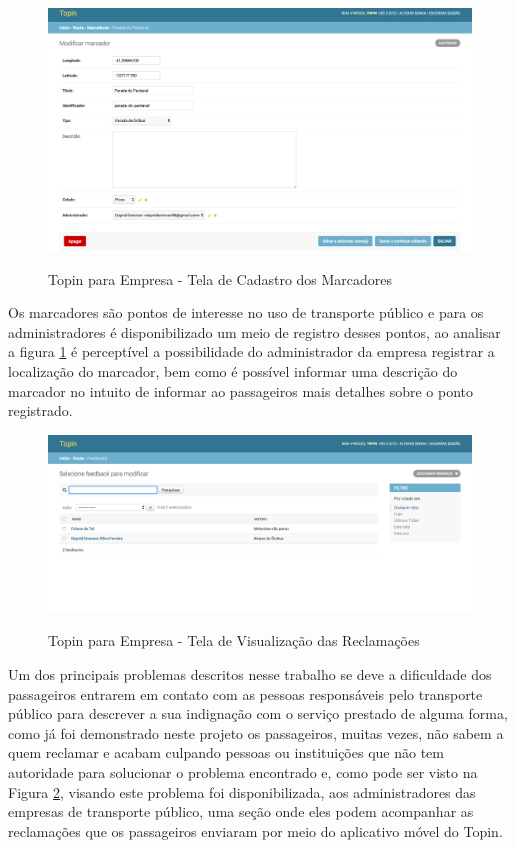 {{{{{{{\begin{figure}[H]
\caption{Topin para Empresa - Tela de Cadastro dos Marcadores}
\centering
\includegraphics[width=1.0\textwidth]{imagens/cadastro-ponto.png}
\label{fig:empresa-cadastro-ponto}
\end{figure}
Os marcadores são pontos de interesse no uso de transporte público e para os administradores é disponibilizado um meio de registro desses pontos, ao analisar a figura \ref{fig:empresa-cadastro-ponto} é perceptível a possibilidade do administrador da empresa registrar a localização do marcador, bem como é possível informar uma descrição do marcador no intuito de informar ao passageiros mais detalhes sobre o ponto registrado.
\begin{figure}[H]
\caption{Topin para Empresa - Tela de Visualização das Reclamações}
\centering
\includegraphics[width=1.0\textwidth]{imagens/visualizar-reclamacao.png}
\label{fig:empresa-visualizar-reclamacao}
\end{figure}

Um dos principais problemas descritos nesse trabalho se deve a dificuldade dos passageiros entrarem em contato com as pessoas responsáveis pelo transporte público para descrever a sua indignação com o serviço prestado de alguma forma, como já foi demonstrado neste projeto os passageiros, muitas vezes, não sabem a quem reclamar e acabam culpando pessoas ou instituições que não tem autoridade para solucionar o problema encontrado e, como pode ser visto na Figura \ref{fig:empresa-visualizar-reclamacao}, visando este problema foi disponibilizada, aos administradores das empresas de transporte público, uma seção onde eles podem acompanhar as reclamações que os passageiros enviaram por meio do aplicativo móvel do Topin.

}}}}}}}

